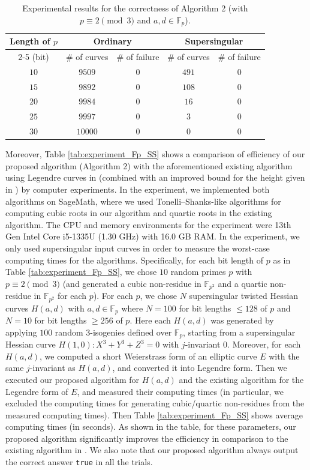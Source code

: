 \documentclass{article}
\theoremstyle{definition}
\newcommand{\FF}{\mathbb{F}}
\begin{document}
%
%
\begin{table}[t]
\centering
\caption{Experimental results for the correctness of Algorithm 2 (with $p \equiv 2 \pmod{3}$ and $a,d \in \FF_p$).}
\label{tab:experiment_Fp_correctness}
\begin{tabular}{c|c|c|c|c}
Length of $p$ & \multicolumn{2}{c|}{Ordinary} & \multicolumn{2}{c}{Supersingular} \\ \cline{2-5}
(bit) & \# of curves & \# of failure & \# of curves & \# of failure \\ \hline
$10$ & $9509$ & $0$ & $491$ & $0$ \\ \hline
$15$ & $9892$ & $0$ & $108$ & $0$ \\ \hline
$20$ & $9984$ & $0$ & $16$ & $0$ \\ \hline
$25$ & $9997$ & $0$ & $3$ & $0$ \\ \hline
$30$ & $10000$ & $0$ & $0$ & $0$
\end{tabular}
\end{table}
%
%

Moreover, Table \ref{tab:experiment_Fp_SS} shows a comparison of efficiency of our proposed algorithm (Algorithm 2) with the aforementioned existing algorithm using Legendre curves in \cite{DBLP:journals/ieiceta/HashimotoN23} (combined with an improved bound for the height given in \cite{hashimoto2024boundsheights2isogenygraphs}) by computer experiments.
In the experiment, we implemented both algorithms on SageMath, where we used Tonelli--Shanks-like algorithms for computing cubic roots in our algorithm and quartic roots in the existing algorithm.
The CPU and memory environments for the experiment were 13th Gen Intel Core i5-1335U (1.30 GHz) with 16.0 GB RAM.
In the experiment, we only used supersingular input curves in order to measure the worst-case computing times for the algorithms.
Specifically, for each bit length of $p$ as in Table \ref{tab:experiment_Fp_SS}, we chose $10$ random primes $p$ with $p \equiv 2 \pmod{3}$ (and generated a cubic non-residue in $\FF_{p^2}$ and a quartic non-residue in $\FF_{p^2}$ for each $p$).
For each $p$, we chose $N$ supersingular twisted Hessian curves $H(a,d)$ with $a,d \in \FF_p$ where $N = 100$ for bit lengths $\leq 128$ of $p$ and $N = 10$ for bit lengths $\geq 256$ of $p$.
Here each $H(a,d)$ was generated by applying $100$ random $3$-isogenies defined over $\FF_p$, starting from a supersingular Hessian curve $H(1,0) \colon X^3 + Y^3 + Z^3 = 0$ with $j$-invariant $0$.
Moreover, for each $H(a,d)$, we computed a short Weierstrass form of an elliptic curve $E$ with the same $j$-invariant as $H(a,d)$, and converted it into Legendre form.
Then we executed our proposed algorithm for $H(a,d)$ and the existing algorithm for the Legendre form of $E$, and measured their computing times (in particular, we excluded the computing times for generating cubic/quartic non-residues from the measured computing times).
Then Table \ref{tab:experiment_Fp_SS} shows average computing times (in seconds).
As shown in the table, for these parameters, our proposed algorithm significantly improves the efficiency in comparison to the existing algorithm in \cite{DBLP:journals/ieiceta/HashimotoN23}.
We also note that our proposed algorithm always output the correct answer \texttt{true} in all the trials.
\end{document}
